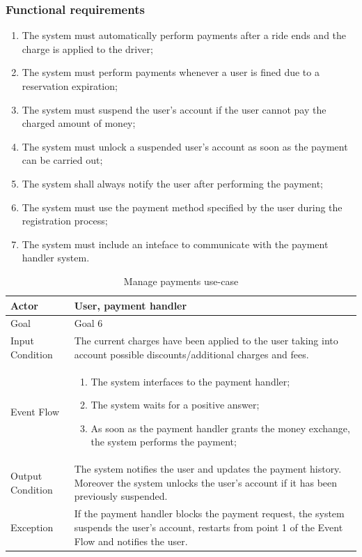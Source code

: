 \subsubsection{Functional requirements}
\begin{enumerate}
\item The system must automatically perform payments after a ride ends and the charge is applied to the driver;
\item The system must perform payments whenever a user is fined due to a reservation expiration;
\item The system must suspend the user's account if the user cannot pay the charged amount of money;
\item The system must unlock a suspended user's account as soon as the payment can be carried out;
\item The system shall always notify the user after performing the payment;
\item The system must use the payment method specified by the user during the registration process;
\item The system must include an inteface to communicate with the payment handler system.
\end{enumerate}

\begin{table}[H]
\begin{center}
\begin{tabular}{p{} | p{}}
\hline
Actor & User, payment handler\\
\hline
Goal & Goal 6\\
\hline
Input Condition & The current charges have been applied to the user taking into account possible discounts/additional charges and fees.\\
\hline
Event Flow & 
\begin{enumerate}
\item The system interfaces to the payment handler;
\item The system waits for a positive answer;
\item As soon as the payment handler grants the money exchange, the system performs the payment;
\end{enumerate} \\
\hline
Output Condition & The system notifies the user and updates the payment history. Moreover the system unlocks the user's account if it has been previously suspended.\\
\hline
Exception & If the payment handler blocks the payment request, the system suspends the user's account, restarts from point 1 of the Event Flow and notifies the user.\\
\hline
\end{tabular}
\end{center}
\caption{Manage payments use-case}
\label{manage_payments_uc}
\end{table}

